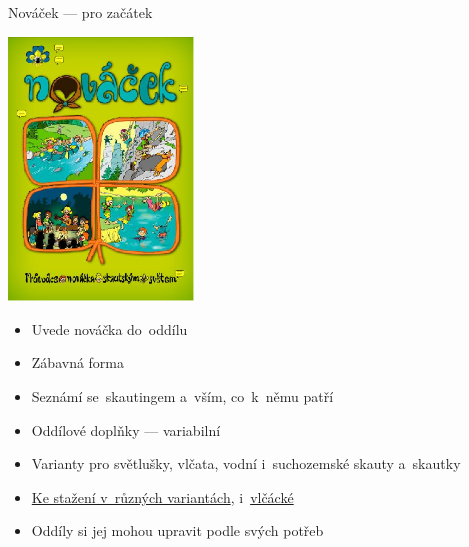 \documentclass[compress, ucs, xelatex, 11pt, xcolor=dvipsnames, print,
	hyperref={
		bookmarks=true,
		unicode=true,
		colorlinks=true,
		pdftitle={Skautska vychovna metoda},
		plainpages=false,
		pdfauthor={Vojtech Zeisek},
		pdfsubject={Skautska vychovna metoda a jeji vyvoj za posledni stoleti a desetileti},
		pdfcreator={XeLaTeX},
		pdfkeywords={Junak, Pedagogika, Skaut, Skauting, Vychovna metoda},
		linkcolor=Black,
		anchorcolor=Black,
		citecolor=OliveGreen,
		filecolor=OliveGreen,
		menucolor=Black,
		urlcolor=OliveGreen,
		pdftex},
	url={hyphens, lowtilde} %
	]{beamer}
\begin{document}
\begin{frame}{Nováček --- pro začátek}
	\begin{multicols}{2}
		\includegraphics[height=7cm]{novacek.png}
		\columnbreak
		\begin{itemize}
			\item Uvede nováčka do~oddílu
			\item Zábavná forma
			\item Seznámí se~skautingem a~vším, co~k~němu patří
			\item Oddílové doplňky --- variabilní
			\item Varianty pro světlušky, vlčata, vodní i~suchozemské skauty a~skautky
			\item \href{https://krizovatka.skaut.cz/oddil/program/skautky-a-skauti/skauti-skautky-stezky/novacek}{Ke stažení v~různých variantách}, i~\href{https://krizovatka.skaut.cz/oddil/program/svetlusky-a-vlcata/vlcata-svetlusky-stezky/kouzelna-lucerna/novacek}{vlčácké}
			\item Oddíly si jej mohou upravit podle svých potřeb
		\end{itemize}
	\end{multicols}
\end{frame}
\end{document}
